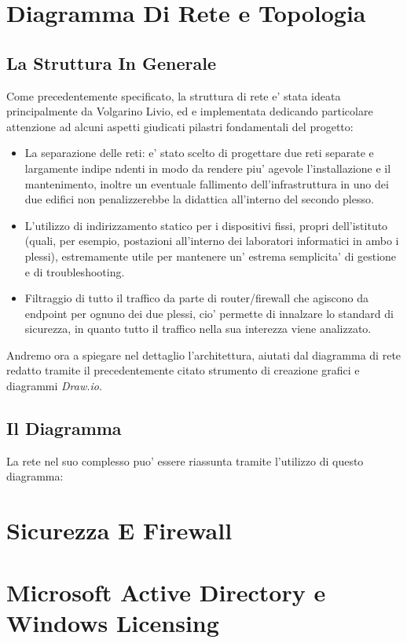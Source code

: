 \documentclass{report}
\begin{document}
    \chapter{Diagramma Di Rete e Topologia}
        \author{Volgarino Livio}
        \section{La Struttura In Generale}
        Come precedentemente specificato, la struttura di rete e' stata ideata principalmente da Volgarino Livio, ed e
         implementata dedicando particolare attenzione ad alcuni aspetti giudicati pilastri fondamentali del progetto:
         \begin{itemize}
             \item La separazione delle reti: e' stato scelto di progettare due reti separate e largamente indipe ndenti
              in modo da rendere piu' agevole l'installazione e il mantenimento, inoltre un eventuale fallimento
              dell'infrastruttura in uno dei due edifici non penalizzerebbe la didattica all'interno del secondo plesso.
             \item L'utilizzo di indirizzamento statico per i dispositivi fissi, propri dell'istituto (quali, per esempio,
              postazioni all'interno dei laboratori informatici in ambo i plessi), estremamente utile per mantenere un'
              estrema semplicita' di gestione e di troubleshooting.
             \item Filtraggio di tutto il traffico da parte di router/firewall che agiscono da endpoint per ognuno dei due
              plessi, cio' permette di innalzare lo standard di sicurezza, in quanto tutto il traffico nella sua interezza
              viene analizzato.
         \end{itemize}
        Andremo ora a spiegare nel dettaglio l'architettura, aiutati dal diagramma di rete redatto tramite il precedentemente
         citato strumento di creazione grafici e diagrammi \emph{Draw.io}.
        \section{Il Diagramma}
        La rete nel suo complesso puo' essere riassunta tramite l'utilizzo di questo diagramma:
    \chapter{Sicurezza E Firewall}
        \author{Serena Thomas}
    \chapter{Microsoft Active Directory e Windows Licensing}
        \author{Catone Mario}
\end{document}
